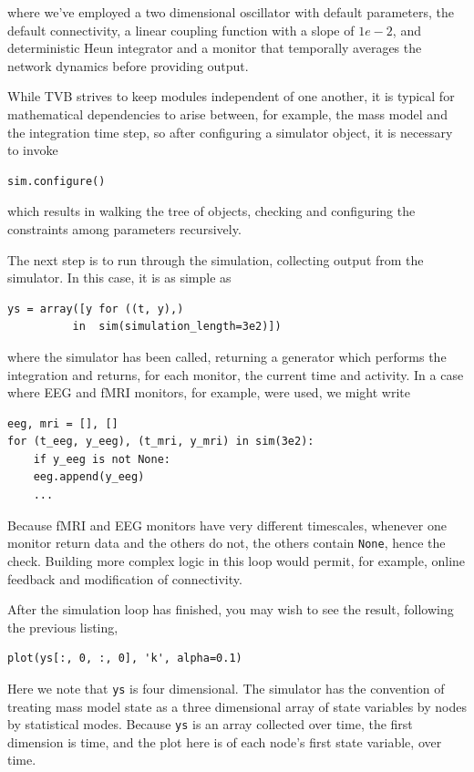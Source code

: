 \noindent where we've employed a two dimensional oscillator
with default parameters, the default connectivity, a linear 
coupling function with a slope of $1e-2$, and deterministic
Heun integrator and a monitor that temporally averages the 
network dynamics before providing output.

While TVB strives to keep modules independent of one another,
it is typical for mathematical dependencies to arise between, 
for example, the mass model and the integration time step, so
after configuring a simulator object, it is necessary to invoke

\begin{lstlisting}
sim.configure()
\end{lstlisting}

which results in walking the tree of objects, checking and 
configuring the constraints among parameters recursively.

The next step is to run through the simulation, collecting
output from the simulator. In this case, it is as simple as
\begin{lstlisting}
ys = array([y for ((t, y),) 
          in  sim(simulation_length=3e2)])
\end{lstlisting}
\noindent where the simulator has been called, returning a 
generator which performs the integration and returns, for each
monitor, the current time and activity. In a case where EEG 
and fMRI monitors, for example, were used, we might write
\begin{lstlisting}
eeg, mri = [], []
for (t_eeg, y_eeg), (t_mri, y_mri) in sim(3e2):
    if y_eeg is not None:
    eeg.append(y_eeg)
    ...
\end{lstlisting}
\noindent Because fMRI and EEG monitors have very different
timescales, whenever one monitor return data and the others do
not, the others contain \texttt{None}, hence the check. Building
more complex logic in this loop would permit, for example, online
feedback and modification of connectivity. 

After the simulation loop has finished, you may wish to see the
result, following the previous listing, 
\begin{lstlisting}
plot(ys[:, 0, :, 0], 'k', alpha=0.1)
\end{lstlisting}
\noindent Here we note that \texttt{ys} is four dimensional. The 
simulator has the convention of treating  mass model state as a
three dimensional array of state variables by nodes by statistical
modes. Because \texttt{ys} is an array collected over time, the first
dimension is time, and the plot here is of each node's first state
variable, over time.

